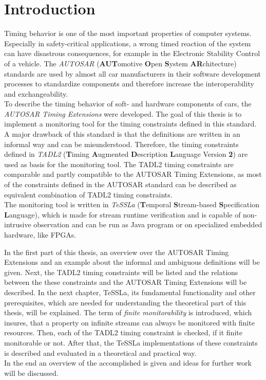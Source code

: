 
\chapter{Introduction}

Timing behavior is one of the most important properties of computer systems. Especially in safety-critical applications, a wrong timed reaction of the system can have disastrous consequences, for example in the Electronic Stability Control of a vehicle. The \emph{AUTOSAR} (\textbf{AUT}omotive \textbf{O}pen \textbf{S}ystem \textbf{AR}chitecture) standards are used by almost all car manufacturers in their software development processes to standardize components and therefore increase the interoperability and exchangeability.\\
To describe the timing behavior of soft- and hardware components of cars, the \emph{AUTOSAR Timing Extensions} were developed. The goal of this thesis is to implement a monitoring tool for the timing constraints defined in this standard.\\
A major drawback of this standard is that the definitions are written in an informal way and can be misunderstood. Therefore, the timing constraints defined in \emph{TADL2} (\textbf{T}iming \textbf{A}ugmented \textbf{D}escription \textbf{L}anguage Version \textbf{2}) are used as basis for the monitoring tool. The TADL2 timing constraints are comparable and partly compatible to the AUTOSAR Timing Extensions, as most of the constraints defined in the AUTOSAR standard can be described as equivalent combination of TADL2 timing constraints.\\
The monitoring tool is written in \emph{TeSSLa} (\textbf{T}emporal \textbf{S}tream-based \textbf{S}pecification \textbf{L}anguage), which is made for stream runtime verification and is capable of non-intrusive observation and can be run as Java program or on specialized embedded hardware, like FPGAs.

In the first part of this thesis, an overview over the AUTOSAR Timing Extensions and an example about the informal and ambiguous definitions  will be given. Next, the TADL2 timing constraints will be listed and the relations between the these constraints and the AUTOSAR Timing Extensions will be described.
In the next chapter, TeSSLa, its fundamental functionality and other prerequisites, which are needed for understanding the theoretical part of this thesis, will be explained.
The term of \emph{finite monitorability} is introduced, which insures, that a property on infinite streams can always be monitored with finite resources.
Then, each of the TADL2 timing constraint is checked, if it finite monitorable or not. After that, the TeSSLa implementations of these constraints is described and evaluated in a theoretical and practical way.\\
In the end an overview of the accomplished is given and ideas for further work will be discussed.